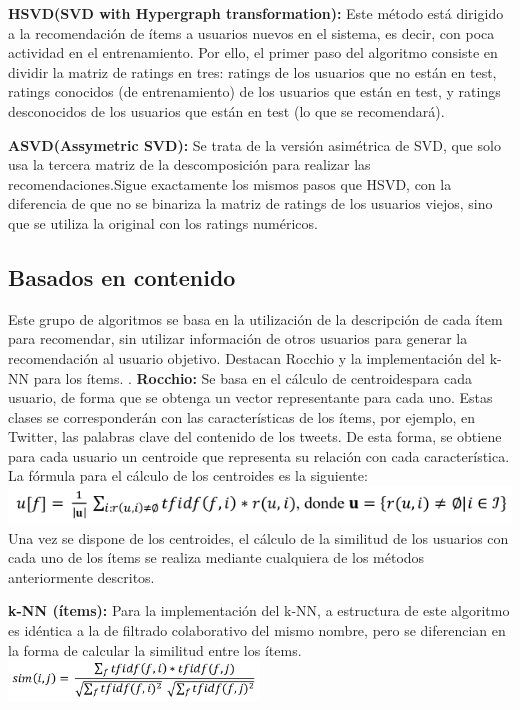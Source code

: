 		\textbf{HSVD(SVD with Hypergraph transformation):} Este método está dirigido a la recomendación de ítems a usuarios nuevos en el sistema, es decir, con poca actividad en el entrenamiento. Por ello, el primer paso del algoritmo consiste en dividir la matriz de ratings en tres: ratings de los usuarios que no están en test, ratings conocidos (de entrenamiento) de los usuarios que están en test, y ratings desconocidos de los usuarios que están en test (lo que se recomendará).

		\textbf{ASVD(Assymetric SVD):} Se trata de la versión asimétrica de SVD, que solo usa la tercera matriz de la descomposición para realizar las recomendaciones.Sigue exactamente los mismos pasos que HSVD, con la diferencia de que no se binariza la matriz de ratings de los usuarios viejos, sino que se utiliza la original con los ratings numéricos.

		\subsection{Basados en contenido}
		Este grupo de algoritmos se basa en la utilización de la descripción de cada ítem para recomendar, sin utilizar información de otros usuarios para generar la recomendación al usuario objetivo. Destacan Rocchio y la implementación del k-NN para los ítems.
.
		\textbf{Rocchio:} Se basa en el cálculo de centroidespara cada usuario, de forma que se obtenga un vector representante para cada uno. Estas clases se corresponderán con las características de los ítems, por ejemplo, en Twitter, las palabras clave del contenido de los tweets. De esta forma, se obtiene para cada usuario un centroide que representa su relación con cada característica. La fórmula para el cálculo de los centroides es la siguiente:\\
		\includegraphics[width=\textwidth]{images/rocchio}
		Una vez se dispone de los centroides, el cálculo de la similitud de los usuarios con cada uno de los ítems se realiza mediante cualquiera de los métodos anteriormente descritos. 

		\textbf{k-NN (ítems):} Para la implementación del k-NN, a estructura de este algoritmo es idéntica a la de filtrado colaborativo del mismo nombre, pero se diferencian en la forma de calcular la similitud entre los ítems.\\
		\includegraphics[width=0.5\textwidth]{images/knn_items}

